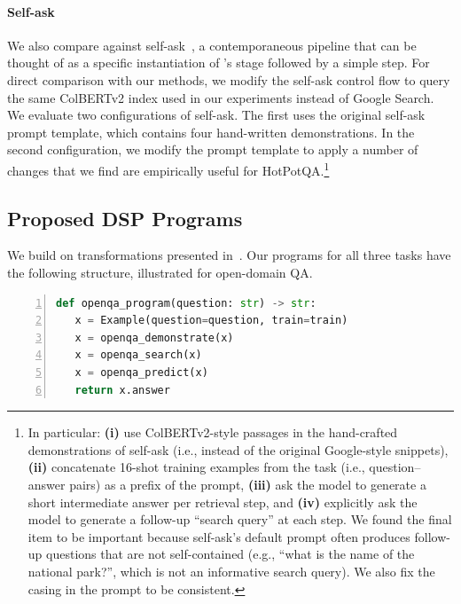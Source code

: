 \paragraph{Self-ask} We also compare against self-ask~\cite{press2022measuring}, a contemporaneous pipeline that can be thought of as a specific instantiation of \DSP's \search stage followed by a simple \predict step. For direct comparison with our methods, we modify the self-ask control flow to query the same ColBERTv2 index used in our \DSP experiments instead of Google Search. We evaluate two configurations of self-ask. The first uses the original self-ask prompt template, which contains four hand-written demonstrations. In the second configuration, we modify the prompt template to apply a number of changes that we find are empirically useful for HotPotQA.\footnote{In particular: \textbf{(i)} use ColBERTv2-style passages in the hand-crafted demonstrations of self-ask (i.e., instead of the original Google-style snippets), \textbf{(ii)} concatenate 16-shot training examples from the task (i.e., question--answer pairs) as a prefix of the prompt, \textbf{(iii)} ask the model to generate a short intermediate answer per retrieval step, and \textbf{(iv)} explicitly ask the model to generate a follow-up ``search query'' at each step. We found the final item to be important because self-ask's default prompt often produces follow-up questions that are not self-contained (e.g., ``what is the name of the national park?'', which is not an informative search query). We also fix the casing in the prompt to be consistent.}






\subsection{Proposed DSP Programs}

We build on transformations presented in~. Our programs for all three tasks have the following structure, illustrated for open-domain QA.

\vspace{3mm}
\begin{lstlisting}[numbers=left,language=Python,breaklines=true]
def openqa_program(question: str) -> str:
   x = Example(question=question, train=train)
   x = openqa_demonstrate(x)
   x = openqa_search(x)
   x = openqa_predict(x)
   return x.answer
\end{lstlisting}

